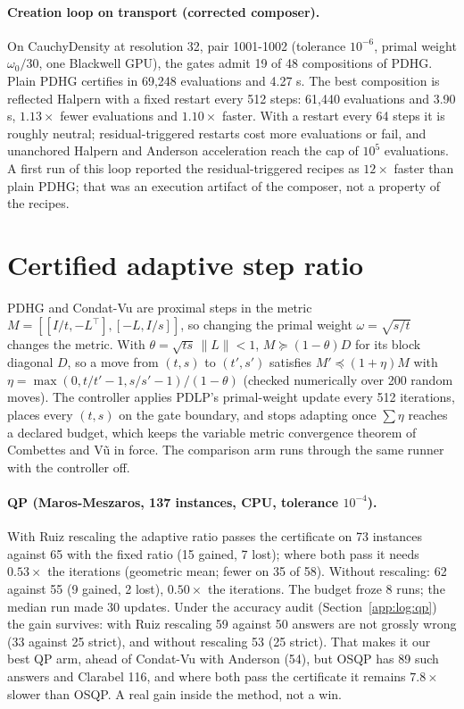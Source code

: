 \documentclass[11pt]{article}
\begin{document}
\paragraph{Creation loop on transport (corrected composer).}
On CauchyDensity at resolution 32, pair 1001-1002 (tolerance $10^{-6}$, primal
weight $\omega_0/30$, one Blackwell GPU), the gates admit 19 of 48 compositions
of PDHG. Plain PDHG certifies in 69,248 evaluations and 4.27 s. The best
composition is reflected Halpern with a fixed restart every 512 steps: 61,440
evaluations and 3.90 s, $1.13\times$ fewer evaluations and $1.10\times$ faster.
With a restart every 64 steps it is roughly neutral; residual-triggered restarts
cost more evaluations or fail, and unanchored Halpern and Anderson acceleration
reach the cap of $10^5$ evaluations. A first run of this loop reported the
residual-triggered recipes as $12\times$ faster than plain PDHG; that was an
execution artifact of the composer, not a
property of the recipes.

\section{Certified adaptive step ratio}
\label{app:log:adaptive}

PDHG and Condat-Vu are proximal steps in the metric
$M = [[I/t, -L^\top], [-L, I/s]]$, so changing the primal weight
$\omega = \sqrt{s/t}$ changes the metric. With $\theta = \sqrt{ts}\,\|L\| < 1$,
$M \succeq (1-\theta)D$ for its block diagonal $D$, so a move from $(t,s)$ to
$(t',s')$ satisfies $M' \preceq (1+\eta)M$ with
$\eta = \max(0, t/t'-1, s/s'-1)/(1-\theta)$ (checked numerically over 200
random moves). The controller applies PDLP's primal-weight update every 512
iterations, places every $(t,s)$ on the gate boundary, and stops adapting
once $\sum\eta$ reaches a declared budget, which keeps the variable metric
convergence theorem of Combettes and V\~u in force. The comparison arm runs
through the same runner with the controller off.

\paragraph{QP (Maros-Meszaros, 137 instances, CPU, tolerance $10^{-4}$).}
With Ruiz rescaling the adaptive ratio passes the certificate on 73
instances against 65 with the fixed ratio (15 gained, 7 lost); where both
pass it needs $0.53\times$ the iterations (geometric mean; fewer on 35 of 58).
Without rescaling: 62 against 55 (9 gained, 2 lost), $0.50\times$ the
iterations. The budget froze 8 runs; the median run made 30 updates. Under the
accuracy audit (Section~\ref{app:log:qp}) the gain survives: with Ruiz
rescaling 59 against 50 answers are not grossly wrong (33 against 25 strict),
and without rescaling 53 (25 strict). That makes it our best QP arm, ahead of
Condat-Vu with Anderson (54), but OSQP has 89 such answers and Clarabel 116,
and where both pass the certificate it remains $7.8\times$ slower than OSQP. A
real gain inside the method, not a win.
\end{document}
